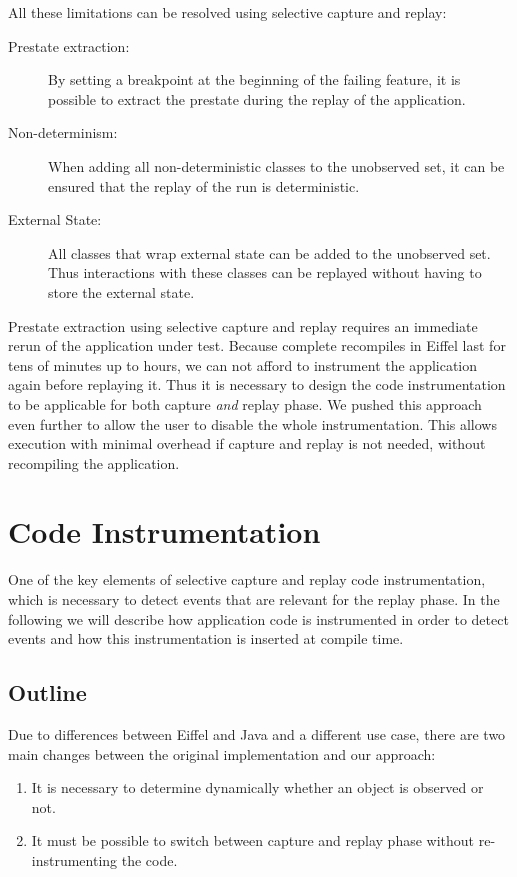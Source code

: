 All these limitations can be resolved using selective capture and replay:
\begin{description}
\item [Prestate extraction:] By setting a breakpoint at the beginning of the failing feature, it is possible to extract the prestate during the replay of the application.
\item [Non-determinism:] When adding all non-deterministic classes to the unobserved set, it can be ensured that the replay of the run is deterministic.
\item [External State:] All classes that wrap external state can be added to the unobserved set. Thus interactions with these classes can be replayed without having to store the external state.
\end{description}

Prestate extraction using selective capture and replay requires an immediate rerun of the application under test. Because complete recompiles in Eiffel last for tens of minutes up to hours, we can not afford to instrument the application again before replaying it. Thus it is necessary to design the code instrumentation to be applicable for both capture \emph{and} replay phase. We pushed this approach even further to allow the user to disable the whole instrumentation. This allows execution with minimal overhead if capture and replay is not needed, without recompiling the application.

\section{Code Instrumentation}
One of the key elements of selective capture and replay code instrumentation, which is necessary to detect events that are relevant for the replay phase. In the following we will describe how application code is instrumented in order to detect events and how this instrumentation is inserted at compile time.

\subsection{Outline}
Due to differences between Eiffel and Java and a different use case, there are two main changes between the original implementation and our approach:

\begin{enumerate}
 \item It is necessary to determine dynamically whether an object is observed or not.
\item It must be possible to switch between capture and replay phase without re-instrumenting the code.
\end{enumerate}


